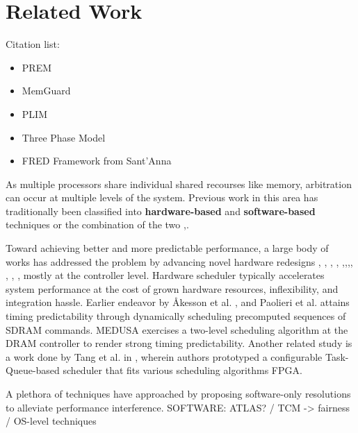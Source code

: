 \section{Related Work}
    Citation list:
    \begin{itemize}
            \item PREM
            \item MemGuard
            \item PLIM
            \item Three Phase Model
            \item FRED Framework from Sant'Anna
     \end{itemize}
   
As multiple processors share individual shared recourses like memory, arbitration can occur at multiple levels of the system. Previous work in this area has traditionally been classified into \textbf{hardware-based}  and \textbf{software-based} techniques or the combination of the two \cite{assayad2010scheduler},\cite{morton2004hardware}. 

Toward achieving better and more predictable performance, a large body of works has addressed the problem by advancing novel hardware redesigns \cite{mutlu2007memory}, \cite{mutlu2007stall} , \cite{mutlu2008parallelism}, \cite{nesbit2006fair}  \cite{cho2005scheduler}, \cite{usui2016dash},\cite{ferri2011soc},\cite{zagan2017cpu},\cite{zhou2016mitts}, \cite{rafique2007effective}, \cite{gupta2010hardware}, \cite{moscibroda2008distributed}, \cite{kuacharoen2003configurable} mostly at the controller level. Hardware scheduler typically accelerates system performance at the cost of grown hardware resources, inflexibility, and integration hassle. Earlier endeavor by Åkesson et al. \cite{akesson2007predator}, \cite{akesson2010predictable} and Paolieri et al. \cite{paolieri2009analyzable} attains timing predictability through dynamically scheduling precomputed sequences of SDRAM commands. MEDUSA \cite{valsan2015medusa} exercises a two-level scheduling algorithm at the DRAM controller to render strong timing predictability. Another related study is a work done by Tang et al. in \cite{tang2014hardware}, wherein authors prototyped a configurable Task-Queue-based scheduler that fits various scheduling algorithms FPGA.


A plethora of techniques have approached by proposing software-only resolutions to alleviate performance interference.
SOFTWARE: ATLAS? / TCM -> fairness / OS-level techniques 

